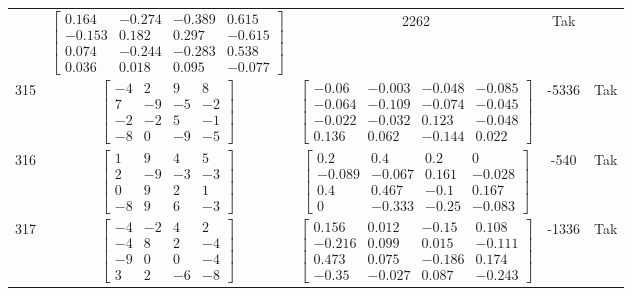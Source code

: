 \documentclass[a4paper,12pt]{article}
\begin{document}
\begin{tabular}{c c c c c}
&
$\begin{bmatrix} 0.164 & -0.274 & -0.389 & 0.615 \\ -0.153 & 0.182 & 0.297 & -0.615 \\ 0.074 & -0.244 & -0.283 & 0.538 \\ 0.036 & 0.018 & 0.095 & -0.077 \end{bmatrix}$
&
2262
&
Tak
\\
315
&
$\begin{bmatrix} -4 & 2 & 9 & 8 \\ 7 & -9 & -5 & -2 \\ -2 & -2 & 5 & -1 \\ -8 & 0 & -9 & -5 \end{bmatrix}$
&
$\begin{bmatrix} -0.06 & -0.003 & -0.048 & -0.085 \\ -0.064 & -0.109 & -0.074 & -0.045 \\ -0.022 & -0.032 & 0.123 & -0.048 \\ 0.136 & 0.062 & -0.144 & 0.022 \end{bmatrix}$
&
-5336
&
Tak
\\
316
&
$\begin{bmatrix} 1 & 9 & 4 & 5 \\ 2 & -9 & -3 & -3 \\ 0 & 9 & 2 & 1 \\ -8 & 9 & 6 & -3 \end{bmatrix}$
&
$\begin{bmatrix} 0.2 & 0.4 & 0.2 & 0 \\ -0.089 & -0.067 & 0.161 & -0.028 \\ 0.4 & 0.467 & -0.1 & 0.167 \\ 0 & -0.333 & -0.25 & -0.083 \end{bmatrix}$
&
-540
&
Tak
\\
317
&
$\begin{bmatrix} -4 & -2 & 4 & 2 \\ -4 & 8 & 2 & -4 \\ -9 & 0 & 0 & -4 \\ 3 & 2 & -6 & -8 \end{bmatrix}$
&
$\begin{bmatrix} 0.156 & 0.012 & -0.15 & 0.108 \\ -0.216 & 0.099 & 0.015 & -0.111 \\ 0.473 & 0.075 & -0.186 & 0.174 \\ -0.35 & -0.027 & 0.087 & -0.243 \end{bmatrix}$
&
-1336
&
Tak
\\

\end{tabular}
\end{document}
